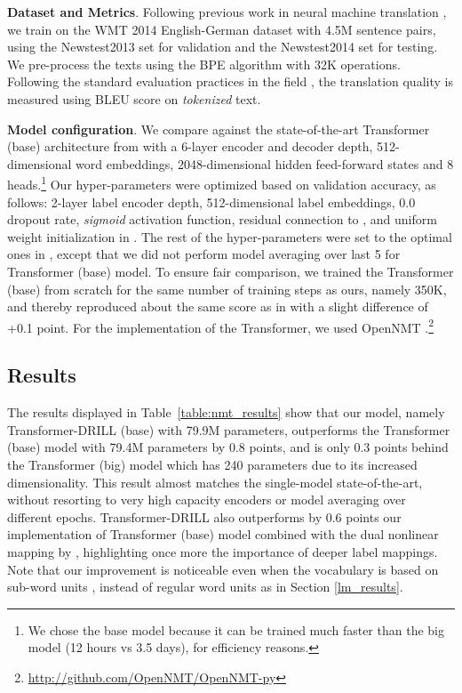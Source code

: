 \documentclass{article}
\begin{document}
\textbf{Dataset and Metrics}. 
Following previous work in neural machine translation \cite{NIPS2017_7181}, we train on the WMT 2014 English-German dataset with 4.5M sentence pairs, using the Newstest2013 set for validation and the Newstest2014 set for testing. We pre-process the texts using the BPE algorithm  \cite{sennrich15} with 32K  operations. Following the standard evaluation practices in the field \cite{bojar-EtAl:2017:WMT1}, the translation quality is measured using BLEU score  \citep{papineni-EtAl:2002:ACL} on \emph{tokenized} text.

\textbf{Model configuration}.
We compare against the state-of-the-art Transformer (base) architecture from  \citet{NIPS2017_7181} with a 6-layer encoder and decoder depth, 512-dimensional word embeddings, 2048-dimensional hidden feed-forward states and 8 heads.\footnote{We chose the base model because it can be trained much faster than the big model (12 hours vs 3.5 days), for efficiency reasons.} Our hyper-parameters were optimized based on validation accuracy, as follows: 2-layer label encoder depth, 512-dimensional label embeddings, 0.0 dropout rate, \textit{sigmoid} activation function, residual connection to , and uniform weight initialization in . The rest of the hyper-parameters were set to the optimal ones in \citep{NIPS2017_7181}, except that we did not perform model averaging over last 5  for Transformer (base) model. To ensure fair comparison, we trained the Transformer (base) from scratch for the same number of training steps as ours, namely 350K, and thereby reproduced about the same score as in \citep{NIPS2017_7181} with a slight difference of +0.1 point. 
For the implementation of the Transformer, we used OpenNMT \citep{opennmt}.\footnote{\url{http://github.com/OpenNMT/OpenNMT-py}}

\subsection{Results}

The results displayed in Table~\ref{table:nmt_results} show that our model, namely Transformer-DRILL (base) with 79.9M parameters, outperforms the Transformer (base) model with 79.4M parameters by 0.8 points, and is only 0.3 points behind the Transformer (big) model which has 240 parameters due to its increased dimensionality. This result almost matches the single-model state-of-the-art, without
resorting to very high capacity encoders or model averaging over different epochs. Transformer-DRILL also outperforms by 0.6 points our implementation of Transformer (base) model combined with the dual nonlinear mapping by \citet{pappas18}, highlighting once more the importance of deeper label mappings. Note that our improvement is noticeable even when the vocabulary is based on sub-word units \cite{sennrich15}, instead of regular word units as in Section \ref{lm_results}. 
\end{document}
